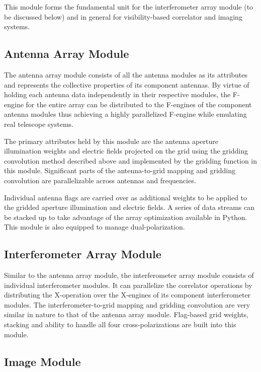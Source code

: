 \documentclass[a4paper,fleqn,usenatbib]{mnras}
\begin{document}
This module forms the fundamental unit for the interferometer array module 
(to be discussed below) and in general for visibility-based correlator and 
imaging systems. 

\subsection{Antenna Array Module}

The antenna array module consists of all the antenna modules as its attributes
and represents the collective properties of its component antennas. By virtue of 
holding each antenna data independently in their respective modules, the F-engine 
for the entire array can be distributed to the F-engines of the component 
antenna modules thus achieving a highly parallelized F-engine while emulating 
real telescope systems.

The primary attributes held by this module are the antenna aperture 
illumination weights and electric fields projected on the grid using the 
gridding convolution method described above and implemented by the gridding 
function in this module. Significant parts of the antenna-to-grid mapping and 
gridding convolution are parallelizable across antennas and frequencies.

Individual antenna flags are carried over as additional weights to be applied
to the gridded aperture illumination and electric fields. A series of data 
streams can be stacked up to take advantage of the array optimization available 
in Python. This module is also equipped to manage dual-polarization. 

\subsection{Interferometer Array Module}

Similar to the antenna array module, the interferometer array module consists of
individual interferometer modules. It can parallelize the correlator operations
by distributing the X-operation over the X-engines of its component 
interferometer modules. The interferometer-to-grid mapping and gridding 
convolution are very similar in nature to that of the antenna array module. 
Flag-based grid weights, stacking and ability to handle all four 
cross-polarizations are built into this module. 

\subsection{Image Module}
\end{document}
